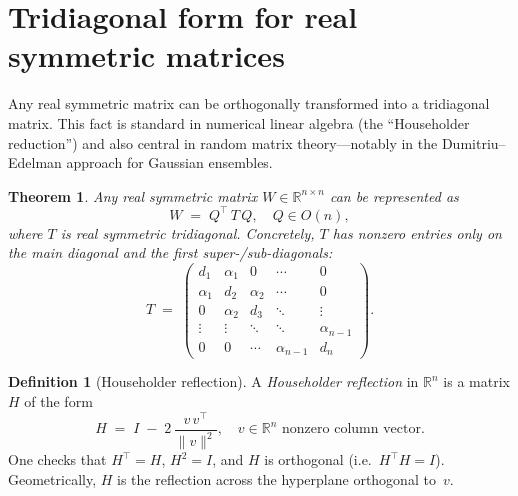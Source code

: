 \documentclass[letterpaper,11pt,oneside,reqno]{article}
\numberwithin{equation}{section}
\newtheorem{theorem}[proposition]{Theorem}
\theoremstyle{definition}
\newtheorem{definition}[proposition]{Definition}
\begin{document}
\section{Tridiagonal form for real symmetric matrices}
\label{sec:householder}

Any real symmetric matrix can be orthogonally transformed into a tridiagonal matrix. This fact is standard in numerical linear algebra (the ``Householder reduction'') and also central in random matrix theory---notably in the Dumitriu--Edelman approach \cite{dumitriu2002matrix} for Gaussian ensembles.

\begin{theorem}
\label{thm:tridiagonal}
Any real symmetric matrix \(W \in \mathbb{R}^{n\times n}\) can be represented as
\[
  W \;=\; Q^\top\, T\, Q,
  \quad
  Q \in O(n),
\]
where \(T\) is real symmetric tridiagonal.  Concretely, \(T\) has nonzero entries only on the main diagonal and the first super-/sub-diagonals:
\[
  T \;=\;
  \begin{pmatrix}
         d_1 & \alpha_1 & 0 & \cdots & 0\\
         \alpha_1 & d_2 & \alpha_2 & \cdots & 0\\
         0 & \alpha_2 & d_3 & \ddots & \vdots\\
         \vdots & \vdots & \ddots & \ddots & \alpha_{n-1}\\
         0 & 0 & \cdots & \alpha_{n-1} & d_n
  \end{pmatrix}.
\]
\end{theorem}

\begin{definition}[Householder reflection]
A \emph{Householder reflection} in \(\mathbb{R}^n\) is a matrix \(H\) of the form
\[
  H \;=\; I \;-\; 2\,\frac{v\,v^\top}{\|v\|^2},
  \quad
  v\in \mathbb{R}^n \text{ nonzero column vector}.
\]
One checks that \(H^\top = H\), \(H^2 = I\), and \(H\) is orthogonal (i.e.\ \(H^\top H = I\)).  Geometrically, \(H\) is the reflection across the hyperplane orthogonal to~\(v\).
\end{definition}
\end{document}
